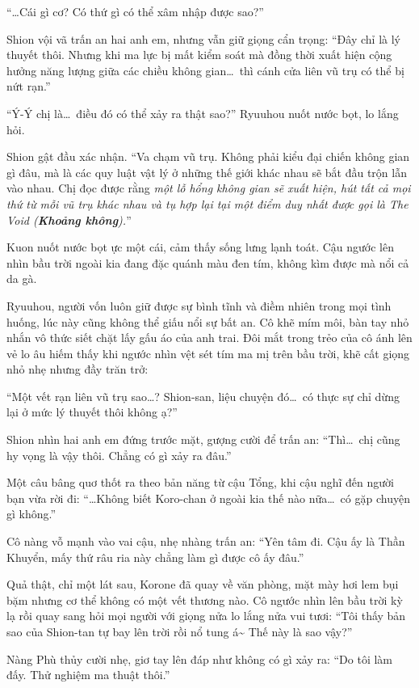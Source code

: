 \documentclass[../main.tex]{subfiles}
\begin{document}
``\dots Cái gì cơ? Có thứ gì có thể xâm nhập được sao?''

Shion vội vã trấn an hai anh em, nhưng vẫn giữ giọng cẩn trọng: ``Đây chỉ là lý thuyết thôi. Nhưng khi ma lực bị mất kiểm soát mà đồng thời xuất hiện cộng hưởng năng lượng giữa các chiều không gian\dots\ thì cánh cửa liên vũ trụ có thể bị nứt rạn.''

``Ý-Ý chị là\dots\ điều đó có thể xảy ra thật sao?'' Ryuuhou nuốt nước bọt, lo lắng hỏi.

Shion gật đầu xác nhận. ``Va chạm vũ trụ. Không phải kiểu đại chiến không gian gì đâu, mà là các quy luật vật lý ở những thế giới khác nhau sẽ bắt đầu trộn lẫn vào nhau. Chị đọc được rằng \emph{một lỗ hổng không gian sẽ xuất hiện, hút tất cả mọi thứ từ mỗi vũ trụ khác nhau và tụ hợp lại tại một điểm duy nhất được gọi là The Void (\textbf{Khoảng không}).}''

Kuon nuốt nước bọt ực một cái, cảm thấy sống lưng lạnh toát. Cậu ngước lên nhìn bầu trời ngoài kia đang đặc quánh màu đen tím, không kìm được mà nổi cả da gà.

Ryuuhou, người vốn luôn giữ được sự bình tĩnh và điềm nhiên trong mọi tình huống, lúc này cũng không thể giấu nổi sự bất an. Cô khẽ mím môi, bàn tay nhỏ nhắn vô thức siết chặt lấy gấu áo của anh trai. Đôi mắt trong trẻo của cô ánh lên vẻ lo âu hiếm thấy khi ngước nhìn vệt sét tím ma mị trên bầu trời, khẽ cất giọng nhỏ nhẹ nhưng đầy trăn trở:

``Một vết rạn liên vũ trụ sao\dots? Shion-san, liệu chuyện đó\dots\ có thực sự chỉ dừng lại ở mức lý thuyết thôi không ạ?''

Shion nhìn hai anh em đứng trước mặt, gượng cười để trấn an: ``Thì\dots\ chị cũng hy vọng là vậy thôi. Chẳng có gì xảy ra đâu.''

Một câu bâng quơ thốt ra theo bản năng từ cậu Tổng, khi cậu nghĩ đến người bạn vừa rời đi: ``\dots Không biết Koro-chan ở ngoài kia thế nào nữa\dots\ có gặp chuyện gì không.''

Cô nàng vỗ mạnh vào vai cậu, nhẹ nhàng trấn an: ``Yên tâm đi. Cậu ấy là Thần Khuyển, mấy thứ râu ria này chẳng làm gì được cô ấy đâu.''

Quả thật, chỉ một lát sau, Korone đã quay về văn phòng, mặt mày hơi lem bụi bặm nhưng cơ thể không có một vết thương nào. Cô ngước nhìn lên bầu trời kỳ lạ rồi quay sang hỏi mọi người với giọng nửa lo lắng nửa vui tươi: ``Tôi thấy bản sao của Shion-tan tự bay lên trời rồi nổ tung á\~{} Thế này là sao vậy?''

Nàng Phù thủy cười nhẹ, giơ tay lên đáp như không có gì xảy ra: ``Do tôi làm đấy. Thử nghiệm ma thuật thôi.''
\end{document}
